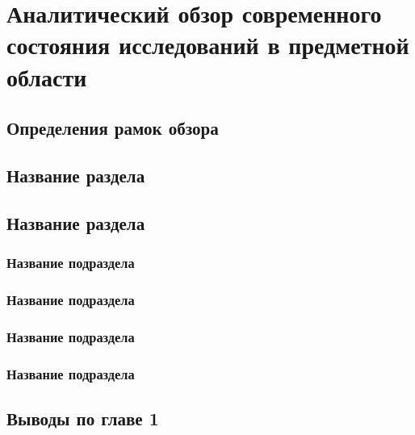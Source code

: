 \chapter{Аналитический обзор современного состояния исследований в предметной области}\label{ch:ch1}

\section{Определения рамок обзора}\label{sec:ch1/sec1}

\section{Название раздела}\label{sec:ch1/sec2}

\section{Название раздела}\label{sec:ch1/sec3}

\subsection{Название подраздела}\label{subsec:ch1/sec3/sub1}

\subsection{Название подраздела}\label{subsec:ch1/sec3/sub2}

\subsection{Название подраздела}\label{subsec:ch1/sec3/sub3}

\subsection{Название подраздела}\label{subsec:ch1/sec3/sub4}

\section{Выводы по главе 1}

\FloatBarrier
